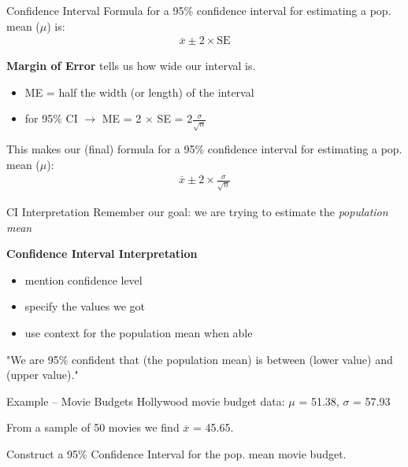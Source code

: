 \documentclass{beamer}
\begin{document}
\begin{frame}{Confidence Interval}
Formula for a 95\% confidence interval for estimating a pop. mean ($\mu$) is:
\begin{align*}
\overline{x} \pm 2 \times \text{SE}
\end{align*} \vspace{2mm}


\textbf{Margin of Error} tells us how wide our interval is.
\begin{itemize}
    \item ME = half the width (or length) of the interval
    \item for 95\% CI $\rightarrow$ ME = 2
    $\times$ SE = 2$\frac{\sigma}{\sqrt{n}}$
\end{itemize} \vspace{8mm}

This makes our (final) formula for a 95\% confidence interval for estimating a pop. mean ($\mu$):
\begin{align*}
\overline{x} \pm 2 \times \frac{\sigma}{\sqrt{n}}
\end{align*} \vspace{4mm}
\end{frame}

\begin{frame}{CI Interpretation}
Remember our goal: we are trying to estimate the \textit{population mean} \vspace{6mm}

\textbf{Confidence Interval Interpretation}
\begin{itemize}
    \item mention confidence level
    \item specify the values we got
    \item use context for the population mean when able
\end{itemize} \vspace{6mm}

"We are 95\% confident that (the population mean) is between (lower value) and (upper value)."
\end{frame}

\begin{frame}{Example -- Movie Budgets}
Hollywood movie budget data: $\mu$ = 51.38, $\sigma$ = 57.93 \vspace{2mm}

From a sample of 50 movies we find $\overline{x}$ = 45.65. \vspace{2mm} 

Construct a 95\% Confidence Interval for the pop. mean movie budget. 
\vspace{30mm}
\end{frame}
\end{document}

